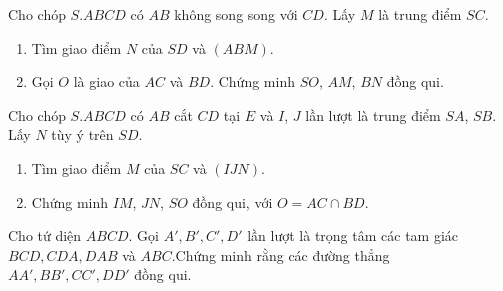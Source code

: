 			\begin{bt}%
				Cho chóp $S.ABCD$ có $AB$ không song song với $CD$. Lấy $M$ là trung điểm $SC$.
				\begin{enumerate}
					\item Tìm giao điểm $N$ của $SD$ và $(ABM)$.
					\item Gọi $O$ là giao của $AC$ và $BD$. Chứng minh  $SO$, $AM$, $BN$ đồng qui.
				\end{enumerate}
			\end{bt}
			
			
			\begin{bt}%
				Cho chóp $S.ABCD$ có $AB$ cắt $CD$ tại $E$ và $I$, $J$ lần lượt là trung điểm $SA$, $SB$. Lấy $N$ tùy ý trên $SD$.
				\begin{enumerate}
					\item Tìm giao điểm $M$ của $SC$ và $(IJN)$.
					\item Chứng minh $IM$, $JN$, $SO$ đồng qui, với $O=AC\cap BD$.
				\end{enumerate}
			\end{bt}
			\begin{bt}%
				Cho tứ diện $ABCD$. Gọi $A', B', C', D'$ lần lượt là trọng tâm các tam giác $BCD, CDA, DAB$ và $ABC$.Chứng minh rằng các đường thẳng $AA', BB', CC', DD'$ đồng qui. 
			\end{bt}
